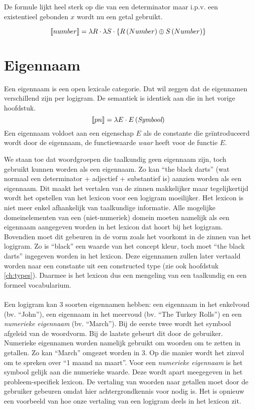 De formule lijkt heel sterk op die van een determinator maar i.p.v. een existentieel gebonden $x$ wordt nu een getal gebruikt.

$$\llbracket number\rrbracket = \lambda R \cdot \lambda S \cdot \left\{ R \left( Number \right) \oplus S \left( Number \right) \right\}$$

\section{Eigennaam}
Een eigennaam is een open lexicale categorie. Dat wil zeggen dat de eigennamen verschillend zijn per logigram. De semantiek is identiek aan die in het vorige hoofdstuk. $$\llbracket pn\rrbracket = \lambda E \cdot E \left( \textit{Symbool} \right)$$ Een eigennaam voldoet aan een eigenschap $E$ als de constante die geïntroduceerd wordt door de eigennaam, de functiewaarde \textit{waar} heeft voor de functie $E$.

We staan toe dat woordgroepen die taalkundig geen eigennaam zijn, toch gebruikt kunnen worden als een eigennaam. Zo kan ``the black darts'' (wat normaal een determinator + adjectief + substantief is) aanzien worden als een eigennaam. Dit maakt het vertalen van de zinnen makkelijker maar tegelijkertijd wordt het opstellen van het lexicon voor een logigram moeilijker. Het lexicon is niet meer enkel afhankelijk van taalkundige informatie. Alle mogelijke domeinelementen van een (niet-numeriek) domein moeten namelijk als een eigennaam aangegeven worden in het lexicon dat hoort bij het logigram. Bovendien moet dit gebeuren in de vorm zoals het voorkomt in de zinnen van het logigram. Zo is ``black'' een waarde van het concept kleur, toch moet ``the black darts'' ingegeven worden in het lexicon. Deze eigennamen zullen later vertaald worden naar een constante uit een constructed type (zie ook hoofdstuk \ref{ch:types}). Daarmee is het lexicon dus een mengeling van een taalkundig en een formeel vocabularium.

\paragraph{}Een logigram kan 3 soorten eigennamen hebben: een eigennaam in het enkelvoud (bv. ``John''), een eigennaam in het meervoud (bv. ``The Turkey Rolls'') en een \textit{numerieke eigennaam} (bv. ``March''). Bij de eerste twee wordt het symbool afgeleid van de woordvorm. Bij de laatste gebeurt dit door de gebruiker. Numerieke eigennamen worden namelijk gebruikt om woorden om te zetten in getallen. Zo kan ``March'' omgezet worden in 3. Op die manier wordt het zinvol om te spreken over ``1 maand na maart''. Voor een \textit{numerieke eigennaam} is het symbool gelijk aan die numerieke waarde. Deze wordt apart meegegeven in het probleem-specifiek lexicon. De vertaling van woorden naar getallen moet door de gebruiker gebeuren omdat hier achtergrondkennis voor nodig is. Het is opnieuw een voorbeeld van hoe onze vertaling van een logigram deels in het lexicon zit.

